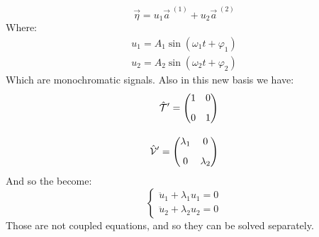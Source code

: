 \begin{equation}
    \vec{\eta} = u_1 \vec{a}^{\;(1)} + u_2 \vec{a}^{\;(2)}
\end{equation}
Where:
\begin{equation}
    \begin{split}
        u_1 = A_1 \sin(\omega_1 t + \varphi_1)\\[8pt]
        u_2 = A_2 \sin(\omega_2 t + \varphi_2)
    \end{split}
\end{equation}
Which are monochromatic signals. Also in this new basis we have:
\begin{equation}
    \begin{split}
        \hat{\mathcal{T}}' = \begin{pmatrix}
            1 & 0\\[8pt]
            0 & 1
        \end{pmatrix}\\[8pt]
        \hat{\mathcal{V}}' = \begin{pmatrix}
            \lambda_1 & 0\\[8pt]
            0 & \lambda_2
        \end{pmatrix}
    \end{split}
\end{equation}
And so the \eleref\;become:
\begin{equation}
    \begin{cases}
        \ddot{u}_1+\lambda_1 u_1 = 0\\[8pt]
        \ddot{u}_2+\lambda_2 u_2 = 0
    \end{cases}
\end{equation}
Those are not coupled equations, and so they can be solved separately.


